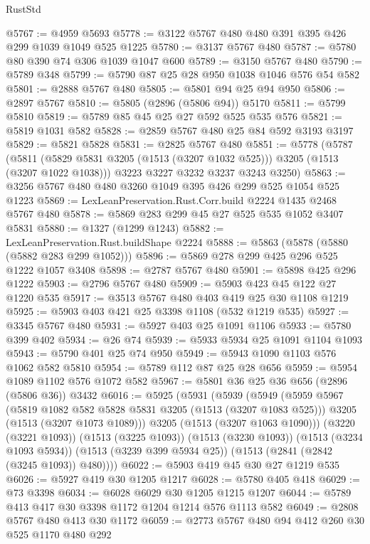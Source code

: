 \begin{lexlean}{RustStd}
\begin{coremodule}
@5767 := @4959 @5693
@5778 := @3122 @5767 @480 @480 @391 @395 @426 @299 @1039 @1049 @525 @1225
@5780 := @3137 @5767 @480
@5787 := @5780 @80 @390 @74 @306 @1039 @1047 @600
@5789 := @3150 @5767 @480
@5790 := @5789 @348
@5799 := @5790 @87 @25 @28 @950 @1038 @1046 @576 @54 @582
@5801 := @2888 @5767 @480
@5805 := @5801 @94 @25 @94 @950
@5806 := @2897 @5767
@5810 := @5805 (@2896 (@5806 @94)) @5170
@5811 := @5799 @5810
@5819 := @5789 @85 @45 @25 @27 @592 @525 @535 @576
@5821 := @5819 @1031 @582
@5828 := @2859 @5767 @480 @25 @84 @592 @3193 @3197
@5829 := @5821 @5828
@5831 := @2825 @5767 @480
@5851 := @5778
    (@5787
      (@5811 (@5829 @5831 @3205 (@1513 (@3207 @1032 @525))) @3205 (@1513 (@3207 @1022 @1038)))
      @3223
      @3227
      @3232
      @3237
      @3243
      @3250)
@5863 := @3256 @5767 @480 @480 @3260 @1049 @395 @426 @299 @525 @1054 @525 @1223
@5869 := LexLeanPreservation.Rust.Corr.build @2224 @1435 @2468 @5767 @480
@5878 := @5869 @283 @299 @45 @27 @525 @535 @1052 @3407 @5831
@5880 := @1327 (@1299 @1243)
@5882 := LexLeanPreservation.Rust.buildShape @2224
@5888 := @5863 (@5878 (@5880 (@5882 @283 @299 @1052)))
@5896 := @5869 @278 @299 @425 @296 @525 @1222 @1057 @3408
@5898 := @2787 @5767 @480
@5901 := @5898 @425 @296 @1222
@5903 := @2796 @5767 @480
@5909 := @5903 @423 @45 @122 @27 @1220 @535
@5917 := @3513 @5767 @480 @403 @419 @25 @30 @1108 @1219
@5925 := @5903 @403 @421 @25 @3398 @1108 (@532 @1219 @535)
@5927 := @3345 @5767 @480
@5931 := @5927 @403 @25 @1091 @1106
@5933 := @5780 @399 @402
@5934 := @26 @74
@5939 := @5933 @5934 @25 @1091 @1104 @1093
@5943 := @5790 @401 @25 @74 @950
@5949 := @5943 @1090 @1103 @576 @1062 @582 @5810
@5954 := @5789 @112 @87 @25 @28 @656
@5959 := @5954 @1089 @1102 @576 @1072 @582
@5967 := @5801 @36 @25 @36 @656 (@2896 (@5806 @36)) @3432
@6016 := @5925
    (@5931
      (@5939
        (@5949
          (@5959
            @5967
            (@5819 @1082 @582 @5828 @5831 @3205 (@1513 (@3207 @1083 @525)))
            @3205
            (@1513 (@3207 @1073 @1089)))
          @3205
          (@1513 (@3207 @1063 @1090)))
        (@3220 (@3221 @1093))
        (@1513 (@3225 @1093))
        (@1513 (@3230 @1093))
        (@1513 (@3234 @1093 @5934))
        (@1513 (@3239 @399 @5934 @25))
        (@1513 (@2841 (@2842 (@3245 @1093)) @480))))
@6022 := @5903 @419 @45 @30 @27 @1219 @535
@6026 := @5927 @419 @30 @1205 @1217
@6028 := @5780 @405 @418
@6029 := @73 @3398
@6034 := @6028 @6029 @30 @1205 @1215 @1207
@6044 := @5789 @413 @417 @30 @3398 @1172 @1204 @1214 @576 @1113 @582
@6049 := @2808 @5767 @480 @413 @30 @1172
@6059 := @2773 @5767 @480 @94 @412 @260 @30 @525 @1170 @480 @292

\end{coremodule}
\end{lexlean}
